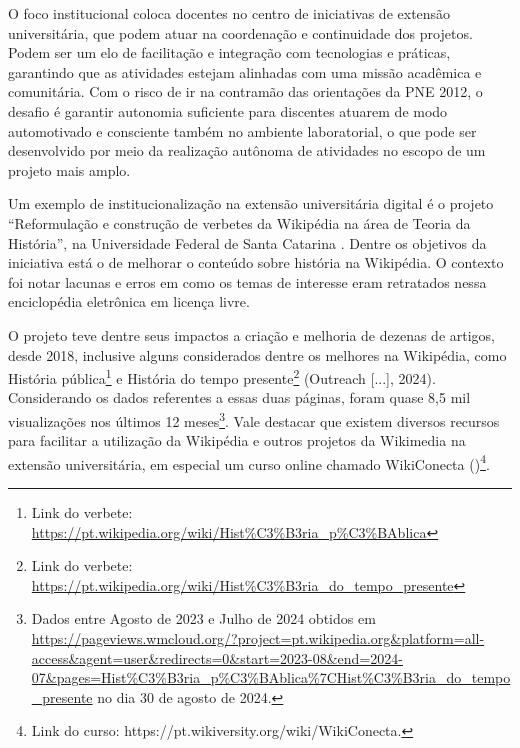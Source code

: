 \documentclass[portuguese]{textolivre}
\begin{document}
O foco institucional coloca docentes no centro de iniciativas de
extensão universitária, que podem atuar na coordenação e continuidade
dos projetos. Podem ser um elo de facilitação e integração com
tecnologias e práticas, garantindo que as atividades estejam alinhadas
com uma missão acadêmica e comunitária. Com o risco de ir na contramão
das orientações da PNE 2012, o desafio é garantir autonomia suficiente
para discentes atuarem de modo automotivado e consciente também no
ambiente laboratorial, o que pode ser desenvolvido por meio da
realização autônoma de atividades no escopo de um projeto mais amplo.

Um exemplo de institucionalização na extensão universitária digital é o
projeto ``Reformulação e construção de verbetes da Wikipédia na área de
Teoria da História'', na Universidade Federal de Santa Catarina
\cite{Varella2020}. Dentre os objetivos da iniciativa está o de
melhorar o conteúdo sobre história na Wikipédia. O contexto foi notar
lacunas e erros em como os temas de interesse eram retratados nessa
enciclopédia eletrônica em licença livre.

O projeto teve dentre seus impactos a criação e melhoria de dezenas de
artigos, desde 2018, inclusive alguns considerados dentre os melhores na
Wikipédia, como História pública\footnote{Link do
  verbete:
  \url{https://pt.wikipedia.org/wiki/Hist\%C3\%B3ria_p\%C3\%BAblica}} e
História do tempo presente\footnote{Link do verbete:
  \url{https://pt.wikipedia.org/wiki/Hist\%C3\%B3ria_do_tempo_presente}}
(Outreach {[}...{]}, 2024). Considerando os dados referentes a essas
duas páginas, foram quase 8,5 mil visualizações nos últimos 12
meses\footnote{Dados entre Agosto de 2023 e Julho de
  2024 obtidos em
  \url{https://pageviews.wmcloud.org/?project=pt.wikipedia.org\&platform=all-access\&agent=user\&redirects=0\&start=2023-08\&end=2024-07\&pages=Hist\%C3\%B3ria_p\%C3\%BAblica\%7CHist\%C3\%B3ria_do_tempo_presente}
  no dia 30 de agosto de 2024.}. Vale destacar que existem diversos
recursos para facilitar a utilização da Wikipédia e outros projetos da
Wikimedia na extensão universitária, em especial um curso online chamado
WikiConecta ()\footnote{Link do curso:
  https://pt.wikiversity.org/wiki/WikiConecta.}.
\end{document}
